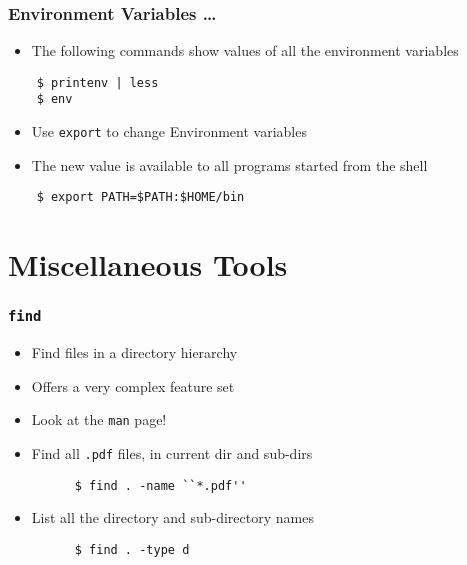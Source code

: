\documentclass[12pt,compress]{beamer}
\begin{document}
\begin{frame}[fragile]
  \frametitle{Environment Variables \ldots}
  \begin{itemize}
  \item The following commands show values of all the environment
    variables
  \end{itemize}
  \begin{lstlisting}
    $ printenv | less
    $ env
  \end{lstlisting} %
  \begin{itemize}
  \item Use \texttt{export} to change Environment variables
  \item The new value is available to all programs started from the shell
  \end{itemize}
  \begin{lstlisting}
    $ export PATH=$PATH:$HOME/bin
  \end{lstlisting} %
\end{frame}

\section{Miscellaneous Tools}

\begin{frame}[fragile]
  \frametitle{\texttt{find}}
  \begin{itemize}
  \item Find files in a directory hierarchy
  \item Offers a very complex feature set
  \item Look at the \texttt{man} page!
  \end{itemize}
  \begin{itemize}
  \item Find all \texttt{.pdf} files, in current dir and sub-dirs
    \begin{lstlisting}
      $ find . -name ``*.pdf''
    \end{lstlisting} %
  \item List all the directory and sub-directory names
    \begin{lstlisting}
      $ find . -type d
    \end{lstlisting} %
  \end{itemize}
\end{frame}
\end{document}
